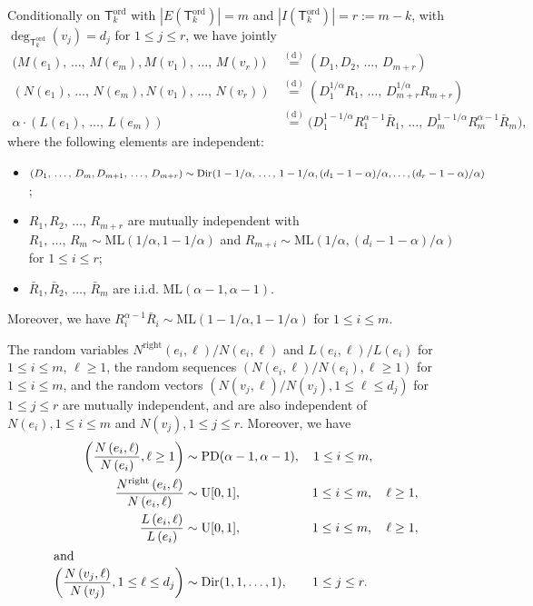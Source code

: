 \documentclass[10pt]{amsart}
\theoremstyle{definition}\newtheorem{defi}[theo]{Definition}\newtheorem{rema}[theo]{Remark}\newtheorem{exam}[theo]{Example}\newtheorem{exem}[theo]{Example}\newtheorem{nota}[theo]{Notation}
\newcommand{\equidist}{\ensuremath{\stackrel{\mathrm{(d)}}{=}}}
\newcommand{\ord}{\mathrm{ord}}
\newcommand{\ML}{\mathrm{ML}}
\newcommand{\PD}{\mathrm{PD}}
\newcommand{\Rightll}{\mathrm{right}}
\newcommand{\rmU}{\mathrm{U}}
\newcommand{\Dir}{\mathrm{Dir}}
\newcommand{\sT}{\mathsf{T}}
\begin{document}
\begin{prop}\label{prop:jointlaws}
Conditionally on $\sT_k^{\ord}$ with $|E(\sT_k^{\ord})| = m$ and $|I(\sT_k^{\ord})| = r := m-k$, with $\deg_{\sT_k^{\ord}}(v_j) = d_j$ for $1 \le j \le r$, we have jointly
\begin{align*}
\big(M(e_1),\,\ldots,\,M(e_{m}), M(v_1),\,\ldots, \,M(v_r) \big) & \equidist \left(D_1, D_2,\,\ldots,\, D_{m+r}\right)\\
\left(N(e_1),\,\ldots,\,N(e_m), N(v_1),\,\ldots,\, N(v_r) \right) & \equidist \left(D_1^{1/\alpha} R_1, \,\ldots,\,D_{m+r}^{1/\alpha} R_{m+r}\right) \\
\alpha \cdot \left(L(e_1),\,\ldots,\,L(e_m) \right) & \equidist
 \big(D_1^{1-1/\alpha} R_1^{\alpha-1} \bar{R}_1,\,\ldots,\, D_m^{1-1/\alpha} R_m^{\alpha-1} \bar{R}_m\big),
\end{align*}
where the following elements are independent:
\begin{itemize}
\item $(D_1,\,\ldots,\,D_m, D_{m+1},\,\ldots,\,D_{m+r}) \sim \Dir(1-1/\alpha,\,\ldots,\,1-1/\alpha, (d_1-1-\alpha)/\alpha,\linebreak\ldots,(d_r-1-\alpha)/\alpha)$;
\item $R_1, R_2,\,\ldots,\,R_{m+r}$ are mutually independent with $R_1,\,\ldots,\,R_m \sim \ML(1/\alpha,1-1/\alpha)$ and $R_{m+i} \sim \ML(1/\alpha,(d_i-1-\alpha)/\alpha)$ for $ 1 \le i \le r$;
\item $\bar{R}_1, \bar{R}_2,\,\ldots,\,\bar{R}_m$ are i.i.d. $\ML(\alpha-1,\alpha-1)$.
\end{itemize}
Moreover, we have $R_i^{\alpha-1}\bar{R}_i \sim \ML(1-1/\alpha, 1-1/\alpha)$ for $1 \le i \le m$.

The random variables $N^{\Rightll}(e_i,\ell)/N(e_i, \ell)$ and $L(e_i,\ell)/L(e_i)$ for $1 \le i \le m$, $\ell \ge 1$, the random sequences $(N(e_i, \ell)/N(e_i), \ell \ge 1)$ for $1 \le i \le m$, and the random vectors $(N(v_j, \ell)/N(v_j), 1 \le \ell \le d_j)$ for $1 \le j \le r$ are mutually independent, and are also independent of $N(e_i), 1 \le i \le m$ and $N(v_j), 1 \le j \le r$. Moreover, we have
\begin{align*}
\left(\frac{N\left(e_i,\ell\right)}{N\left(e_i\right)}, \ell \ge 1\right) &\sim \PD(\alpha-1,\alpha-1),\quad 1 \le i \le m,
\\
\frac{N^{\Rightll}\left(e_i, \ell\right)}{N\left(e_i, \ell\right)} &\sim \rmU[0,1], \mkern100mu 1 \le i \le m, \quad \ell \ge 1,
\\
\frac{L\left(e_i,\ell\right)}{L\left(e_i\right)}&\sim \rmU[0,1], \mkern100mu 1 \le i \le m, \quad \ell \ge 1,\\
\intertext{and}
\left(\frac{N\left(v_j, \ell\right)}{N\left(v_j\right)}, 1 \le \ell \le d_j\right) &\sim \Dir(1,1,\ldots,1), \mkern35mu 1 \le j \le r.
\end{align*}
\end{prop}
\end{document}

